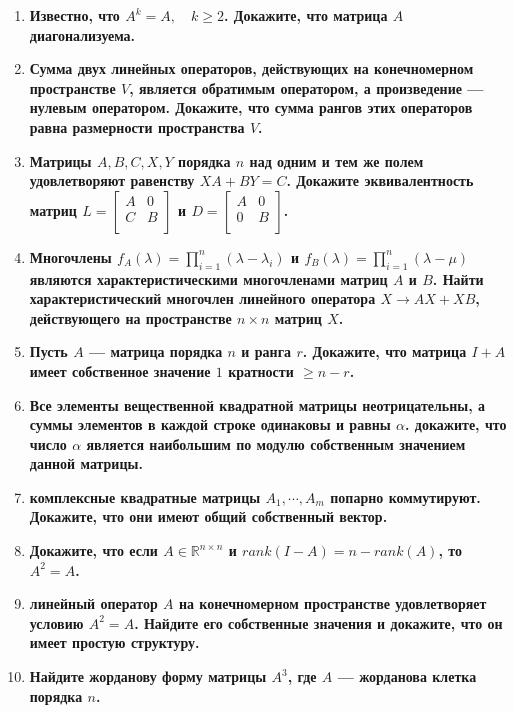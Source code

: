 \documentclass[12pt]{article} %
\begin{document}
\begin{enumerate}
    \item \textbf{Известно, что $A^k = A, \quad k \geqslant 2$. Докажите, что матрица $A$ диагонализуема.}
    \item \textbf{Сумма двух линейных операторов, действующих на конечномерном пространстве $V$, является обратимым оператором, а произведение --- нулевым оператором. Докажите, что сумма рангов этих операторов равна размерности пространства $V$.}
    \item \textbf{Матрицы $A, B, C, X, Y$ порядка $n$ над одним и тем же полем удовлетворяют равенству $XA + BY = C$. Докажите эквивалентность матриц $L = 
    \begin{bmatrix}
        A & 0\\
        C & B\\
    \end{bmatrix}
    $ и $D = 
    \begin{bmatrix}
        A & 0\\
        0 & B\\
    \end{bmatrix}
    $.}
    \item \textbf{Многочлены $f_A(\lambda) = \prod_{i=1}^{n}(\lambda - \lambda_i)$ и $f_B(\lambda) = \prod_{i=1}^{n}(\lambda - \mu)$ являются характеристическими многочленами матриц $A$ и $B$. Найти характеристический многочлен линейного оператора $X \rightarrow AX + XB$, действующего на пространстве $n \times n$ матриц $X$.}
    \item \textbf{Пусть $A$ --- матрица порядка $n$ и ранга $r$. Докажите, что матрица $I + A$ имеет собственное значение $1$ кратности $\geqslant n - r$.}
    \item \textbf{Все элементы вещественной квадратной матрицы неотрицательны, а суммы элементов в каждой строке одинаковы и равны $\alpha$. докажите, что число $\alpha$ является наибольшим по модулю собственным значением данной матрицы.}
    \item \textbf{комплексные квадратные матрицы $A_1, \cdots , A_m$ попарно коммутируют. Докажите, что они имеют общий собственный вектор.}
    \item \textbf{Докажите, что если $A \in \mathds{R}^{n \times n}$ и $rank(I - A) = n - rank(A)$, то $A^2 = A$.}
    \item \textbf{линейный оператор $A$ на конечномерном пространстве удовлетворяет условию $A^2 =A$. Найдите его собственные значения и докажите, что он имеет простую структуру.}
    \item \textbf{Найдите жорданову форму матрицы $A^3$, где $A$ --- жорданова клетка порядка $n$.}

\end{enumerate}
\end{document}
